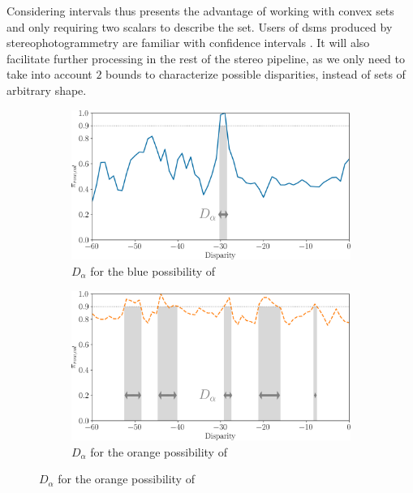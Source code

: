 Considering intervals thus presents the advantage of working with convex sets and only requiring two scalars to describe the set. Users of \acrshort{dsm}s produced by stereophotogrammetry are familiar with confidence intervals \cite{oksanen_digital_2006, wang_robust_2015, panagiotakis_validation_2018, deschamps-berger_apport_2021, hugonnet_uncertainty_2022}. It will also facilitate further processing in the rest of the stereo pipeline, as we only need to take into account $2$ bounds to characterize possible disparities, instead of sets of arbitrary shape.
\begin{figure}
    \centering
    \begin{subfigure}[t]{0.47\linewidth}
        \centering
        \includegraphics[width=\linewidth]{Images/Chap_5/disparity_interval_1.png}
        \caption{$D_\alpha$ for the blue possibility of }
        \label{fig:disparity_intervals_a}
    \end{subfigure}\hfill
    \begin{subfigure}[t]{0.47\linewidth}
        \centering
        \includegraphics[width=\linewidth]{Images/Chap_5/disparity_interval_2.png}
        \caption{$D_\alpha$ for the orange possibility of }

\end{subfigure}
\end{figure}
